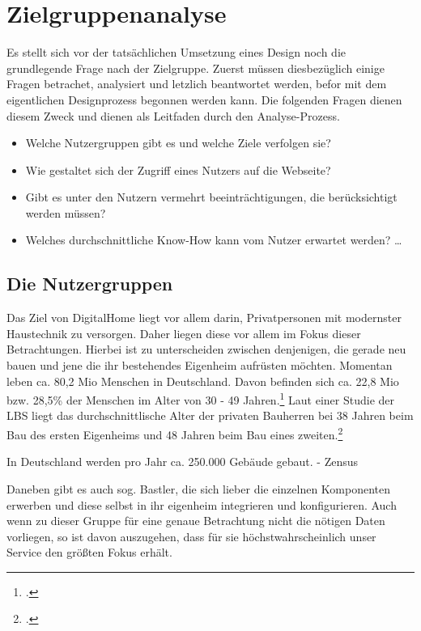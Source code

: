 \section{Zielgruppenanalyse}
Es stellt sich vor der tatsächlichen Umsetzung eines Design noch die grundlegende Frage nach der Zielgruppe. Zuerst müssen diesbezüglich einige Fragen betrachet, analysiert und letzlich beantwortet werden, befor mit dem eigentlichen Designprozess begonnen werden kann. Die folgenden Fragen dienen diesem Zweck und dienen als Leitfaden durch den Analyse-Prozess.
\begin{itemize}
	\item Welche Nutzergruppen gibt es und welche Ziele verfolgen sie?
	\item Wie gestaltet sich der Zugriff eines Nutzers auf die Webseite?
	\item Gibt es unter den Nutzern vermehrt beeinträchtigungen, die berücksichtigt werden müssen?
	\item Welches durchschnittliche Know-How kann vom Nutzer erwartet werden? \ldots
\end{itemize}
\subsection{Die Nutzergruppen}
Das Ziel von DigitalHome liegt vor allem darin, Privatpersonen mit modernster Haustechnik zu versorgen. Daher liegen diese vor allem im Fokus dieser Betrachtungen. Hierbei ist zu unterscheiden zwischen denjenigen, die gerade neu bauen und jene die ihr bestehendes Eigenheim aufrüsten möchten.
Momentan leben ca. 80,2 Mio Menschen in Deutschland. Davon befinden sich ca. 22,8 Mio bzw. 28,5\% der Menschen im Alter von 30 - 49 Jahren.\footcite[vgl.][]{zensus2011:alter} Laut einer Studie der LBS liegt das durchschnittlische Alter der privaten Bauherren bei 38 Jahren beim Bau des ersten Eigenheims und 48 Jahren beim Bau eines zweiten.\footcite[vgl.][]{lbs}

In Deutschland werden pro Jahr ca. 250.000 Gebäude gebaut. - Zensus


Daneben gibt es auch sog. Bastler, die sich lieber die einzelnen Komponenten erwerben und diese selbst in ihr eigenheim integrieren und konfigurieren. Auch wenn zu dieser Gruppe für eine genaue Betrachtung nicht die nötigen Daten vorliegen, so ist davon auszugehen, dass für sie höchstwahrscheinlich unser Service den größten Fokus erhält.